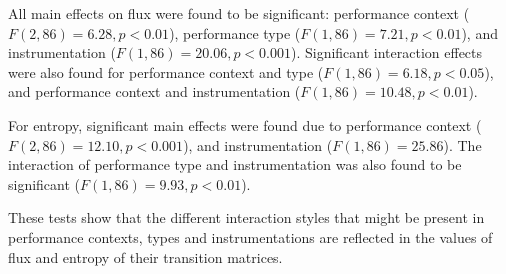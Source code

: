 \documentclass{sigchi}
\begin{document}
All main effects on flux were found to be significant: performance
context ($F(2,86) = 6.28, p < 0.01$), performance type ($F(1,86) =
7.21, p < 0.01$), and instrumentation ($F(1,86) = 20.06, p < 0.001$).
Significant interaction effects were also found for performance
context and type ($F(1,86) = 6.18, p < 0.05$), and performance context and
instrumentation ($F(1,86) = 10.48, p < 0.01$).

For entropy, significant main effects were found due to performance
context ($F(2,86) = 12.10, p < 0.001$), and instrumentation ($F(1,86)
= 25.86$). The interaction of performance type and instrumentation was
also found to be significant ($F(1,86) = 9.93, p<0.01$).

These tests show that the different interaction styles that might be
present in performance contexts, types and instrumentations are
reflected in the values of flux and entropy of their transition
matrices.
\end{document}
